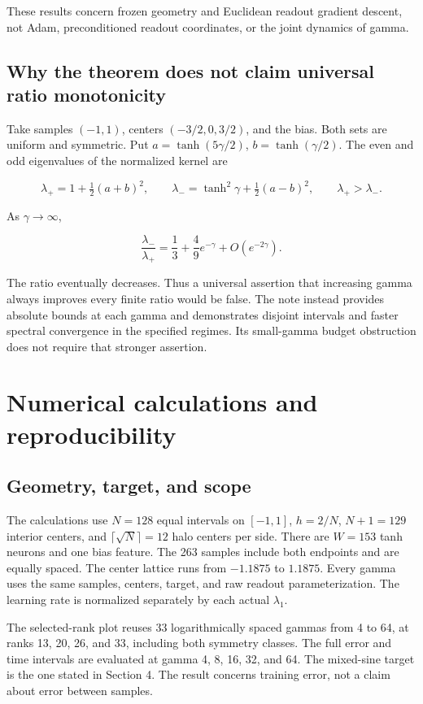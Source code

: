 \documentclass[11pt]{article}
\begin{document}
These results concern frozen geometry and Euclidean readout gradient descent, not Adam, preconditioned readout coordinates, or the joint dynamics of gamma.

\subsection{Why the theorem does not claim universal ratio monotonicity}

Take samples \((-1,1)\), centers \((-3/2,0,3/2)\), and the bias. Both sets are uniform and symmetric. Put \(a=\tanh(5\gamma/2)\), \(b=\tanh(\gamma/2)\). The even and odd eigenvalues of the normalized kernel are

\[
\lambda_+=1+\tfrac12(a+b)^2,
\qquad
\lambda_-=\tanh^2\gamma+\tfrac12(a-b)^2,
\qquad\lambda_+>\lambda_-.
\]

As \(\gamma\to\infty\),

\[
\frac{\lambda_-}{\lambda_+}
=\frac13+\frac49e^{-\gamma}+O(e^{-2\gamma}).
\]

The ratio eventually decreases. Thus a universal assertion that increasing gamma always improves every finite ratio would be false. The note instead provides absolute bounds at each gamma and demonstrates disjoint intervals and faster spectral convergence in the specified regimes. Its small-gamma budget obstruction does not require that stronger assertion.

\section{Numerical calculations and reproducibility}

\subsection{Geometry, target, and scope}

The calculations use \(N=128\) equal intervals on \([-1,1]\), \(h=2/N\), \(N+1=129\) interior centers, and \(\lceil\sqrt N\rceil=12\) halo centers per side. There are \(W=153\) tanh neurons and one bias feature. The 263 samples include both endpoints and are equally spaced. The center lattice runs from \(-1.1875\) to \(1.1875\). Every gamma uses the same samples, centers, target, and raw readout parameterization. The learning rate is normalized separately by each actual \(\lambda_1\).

The selected-rank plot reuses 33 logarithmically spaced gammas from 4 to 64, at ranks 13, 20, 26, and 33, including both symmetry classes. The full error and time intervals are evaluated at gamma 4, 8, 16, 32, and 64. The mixed-sine target is the one stated in Section 4. The result concerns training error, not a claim about error between samples.
\end{document}
